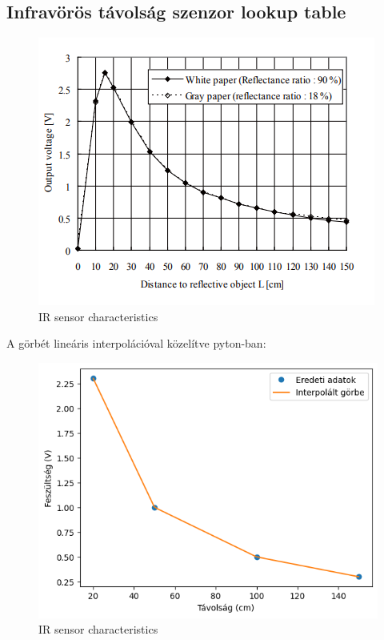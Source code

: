 \documentclass{article}
\begin{document}
\subsection{Infravörös távolság szenzor lookup table}
\begin{figure}[H]
    \centering
    \includegraphics[scale=0.7]{IR_distance_characteristics.png}
    \caption{\label{fig:korondi}IR sensor characteristics}
\end{figure}
A görbét lineáris interpolációval közelítve pyton-ban:

\begin{figure}[H]
    \centering
    \includegraphics[scale=0.7]{Interp.png}
    \caption{\label{fig:korondi}IR sensor characteristics}
\end{figure}
\end{document}
